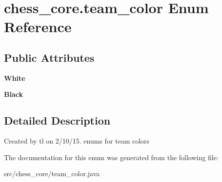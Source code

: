 \hypertarget{enumchess__core_1_1team__color}{}\section{chess\+\_\+core.\+team\+\_\+color Enum Reference}
\label{enumchess__core_1_1team__color}
\subsection*{Public Attributes}
\begin{DoxyCompactItemize}
\item 
\hypertarget{enumchess__core_1_1team__color_a728984c7d43ed7ac493b3856d448cf94}{}{\bfseries White}\label{enumchess__core_1_1team__color_a728984c7d43ed7ac493b3856d448cf94}

\item 
\hypertarget{enumchess__core_1_1team__color_ae3478a6fb68ec863c54ab67bcb011c2d}{}{\bfseries Black}\label{enumchess__core_1_1team__color_ae3478a6fb68ec863c54ab67bcb011c2d}

\end{DoxyCompactItemize}


\subsection{Detailed Description}
Created by tl on 2/10/15. enums for team colors 

The documentation for this enum was generated from the following file\+:\begin{DoxyCompactItemize}
\item 
src/chess\+\_\+core/team\+\_\+color.\+java\end{DoxyCompactItemize}
